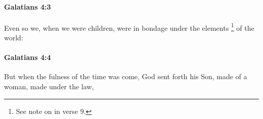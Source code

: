 		\paragraph{Galatians 4:3} %
			\label{GALATIANS-4-3}

			Even so we, when we were children, were in bondage under the elements%
				\footnote{%
					See note on  in verse 9.
					}
			of the world:

			\begin{framed}
			\scriptsize
				\begin{compactdesc}
					\item[SBLG] 
				\end{compactdesc}
			\end{framed}

		\paragraph{Galatians 4:4} %
			\label{GALATIANS-4-4}

			But when the fulness of the time was come, God sent forth his Son, made of a woman, made under the law,

